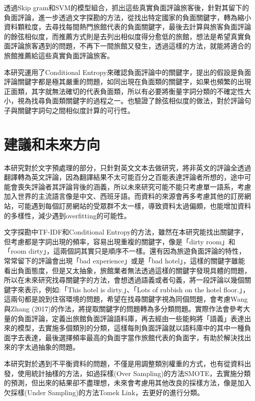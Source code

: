 	透過Skip gram和SVM的模型組合，抓出這些真實負面評論旅客後，針對其留下的負面評論，進一步透過文字探勘的方法，從找出特定國家的負面關鍵字，轉為縮小資料顆粒度，去尋找每間熱門旅館代表的負面關鍵字，最後去計算與旅客負面評論的餘弦相似度，而推薦方式則是去列出相似度得分愈低的旅館，想法是希望真實負面評論旅客遇到的問題，不再下一間旅館又發生，透過這樣的方法，就能將適合的旅館推薦給這些真實負面評論旅客。
	
	本研究運用了Conditional Entropy來確認負面評論中的關鍵字，提出的假設是負面評論關鍵字都是極其嚴重的問題，如同出現在負面類的關鍵字，如果也頻繁的出現正面類，其字就無法確切的代表負面類，所以有必要將衡量字詞分類的不確定性大小，視為找尋負面類關鍵字的過程之一。也驗證了餘弦相似度的做法，對於評論句子與關鍵字詞句之間相似度計算的可行性。
	
\newpage

\section{建議和未來方向}

	本研究對於文字預處理的部分，只針對英文文本去做研究，將非英文的評論全透過翻譯轉為英文評論，因為翻譯結果不太可能百分之百能表達評論者所想的，途中可能會喪失評論者其評論背後的涵義，所以未來研究可能不能只考慮單一語系，考慮加入世界的主流語言像是中文、西班牙語。而資料的來源會再多考慮其他的訂房網站，可能遇到每個訂房網站的受眾群不太一樣，導致資料太過偏頗，也能增加資料的多樣性，減少遇到overfitting的可能性。
	
	文字探勘中TF-IDF和Conditional Entropy的方法，雖然在本研究能找出關鍵字，但考慮都是字詞出現的頻率，容易出現重複的關鍵字，像是「dirty room」和「room dirty」，這兩個詞其實只是順序不一樣。還有因為旅遊負面評論的特性，常常留下的評論會出現「bad experience」或是「bad hotel」，這樣的關鍵字雖能看出負面態度，但是又太抽象，旅館業者無法透過這樣的關鍵字發現具體的問題，所以在未來研究找尋關鍵字的方法，會想透過語義或者句義，將一段評論以幾個關鍵字來表示，例如:「This hotel is dirty.」、「Lots of rubbish on the hotel floor.」，這兩句都是說到住宿環境的問題，希望在找尋關鍵字視為同個問題，會考慮Wang與Zhang (2017)的作法，將提取關鍵字的問題轉為多分類問題。實際作法會參考大量的負面評論，定義出旅館負面評論語料庫，再去經由一些能夠將「語義」表達出來的模型，去實施多個類別的分類，這樣每則負面評論就以語料庫中的其中一種負面字去表達，最後選擇頻率最高的負面字當作旅館代表的負面字，有助於解決找出來的字太過抽象的問題。
	
	本研究對於遇到不平衡資料的問題，不僅是用調整類別權重的方式，也有從資料出發，使用統計抽樣的方法，如過採樣(Over Sampling)的方法SMOTE，去實施分類的預測，但出來的結果卻不盡理想，未來會考慮用其他改良的採樣方法，像是加入欠採樣(Under Sampling)的方法Tomek Link，去更好的進行分類。
	
